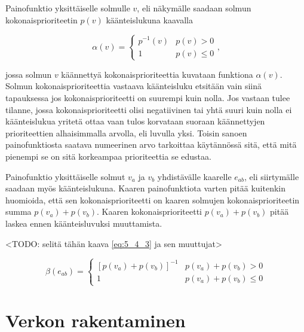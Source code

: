   Painofunktio yksittäiselle solmulle \(v\), eli näkymälle saadaan solmun kokonaisprioriteetin \(p(v)\) käänteislukuna kaavalla

  \begin{equation} \label{eq:5_4_2}
    \alpha(v) = \begin{cases}
      p^{-1}(v) & p(v) > 0 \\
      1 & p(v) \leq 0
    \end{cases}
    \text{,}
  \end{equation}

  jossa solmun \(v\) käännettyä kokonaisprioriteettia kuvataan funktiona \(\alpha(v)\).
  Solmun kokonaisprioriteettia vastaava käänteisluku etsitään vain siinä tapauksessa jos kokonaisprioriteetti on suurempi kuin nolla.
  Jos vastaan tulee tilanne, jossa kokonaisprioriteetti olisi negatiivinen tai yhtä suuri kuin nolla ei käänteislukua yritetä ottaa vaan tulos korvataan suoraan käännettyjen prioriteettien alhaisimmalla arvolla, eli luvulla yksi.
  Toisin sanoen painofunktiosta saatava numeerinen arvo tarkoittaa käytännössä sitä, että mitä pienempi se on sitä korkeampaa prioriteettia se edustaa.

  Painofunktio yksittäiselle solmut \(v_a\) ja \(v_b\) yhdistävälle kaarelle \(e_{ab}\), eli siirtymälle saadaan myös käänteislukuna.
  Kaaren painofunktiota varten pitää kuitenkin huomioida, että sen kokonaisprioriteetti on kaaren solmujen kokonaisprioriteetin summa \(p(v_a) + p(v_b)\).
  Kaaren kokonaisprioriteetti \(p(v_a) + p(v_b)\) pitää laskea ennen käänteisluvuksi muuttamista.

  <TODO: selitä tähän kaava \ref{eq:5_4_3} ja sen muuttujat>

  \begin{equation} \label{eq:5_4_3}
    \beta(e_{ab}) = \begin{cases}
      [p(v_a) + p(v_b)]^{-1} & p(v_a) + p(v_b) > 0 \\
      1 & p(v_a) + p(v_b) \leq 0
    \end{cases}
  \end{equation}

\section{Verkon rakentaminen} \label{ch:10_verkon_rakentaminen}

